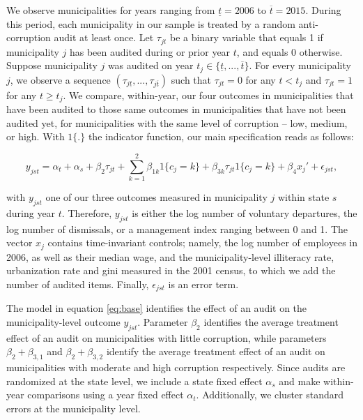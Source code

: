 \documentclass[12pt,a4paper]{article}
\theoremstyle{definition}
\begin{document}
We observe municipalities for years ranging from $\underline{t} = 2006$ to $\overline{t} = 2015$. During this period, each municipality in our sample is treated by a random anti-corruption audit at least once. Let $\tau_{jt}$ be a binary variable that equals 1 if municipality $j$ has been audited during or prior year $t$, and equals 0 otherwise. Suppose municipality $j$ was audited on year $t_j \in \{\underline{t}, ..., \overline{t}\}$. For every municipality $j$, we observe a sequence $(\tau_{j\underline{t}}, ..., \tau_{j\overline{t}})$ such that $\tau_{jt} = 0$ for any $t < t_j$ and $\tau_{jt} = 1$ for any $t \geq t_j$. We compare, within-year, our four outcomes in municipalities that have been audited to those same outcomes in municipalities that have not been audited yet, for municipalities with the same level of corruption -- low, medium, or high. With $1\{.\}$ the indicator function, our main specification reads as follows: 

\begin{equation}
    y_{jst} = \alpha_t + \alpha_s + \beta_2 \tau_{jt} + \sum_{k=1}^2 \beta_{1k} 1\{c_j = k\} +  \beta_{3k} \tau_{jt} 1\{c_j = k\} + \beta_4 x_j' + \epsilon_{jst}, 
    \label{eq:base}
\end{equation}

with $y_{jst}$ one of our three outcomes measured in municipality $j$ within state $s$ during year $t$. Therefore, $y_{jst}$ is either the log number of voluntary departures, the log number of dismissals, or a management index ranging between 0 and 1. The vector $x_j$ contains time-invariant controls; namely, the log number of employees in 2006, as well as their median wage, and the municipality-level illiteracy rate, urbanization rate and gini measured in the 2001 census, to which we add the number of audited items. Finally, $\epsilon_{jst}$ is an error term. 

The model in equation \ref{eq:base} identifies the effect of an audit on the municipality-level outcome $y_{jst}$. Parameter $\beta_2$ identifies the average treatment effect of an audit on municipalities with little corruption, while parameters $\beta_2 + \beta_{3,1}$ and $\beta_2 + \beta_{3,2}$ identify the average treatment effect of an audit on municipalities with moderate and high corruption respectively. Since audits are randomized at the state level, we include a state fixed effect $\alpha_s$ and make within-year comparisons using a year fixed effect $\alpha_t$. Additionally, we cluster standard errors at the municipality level. 
\end{document}
